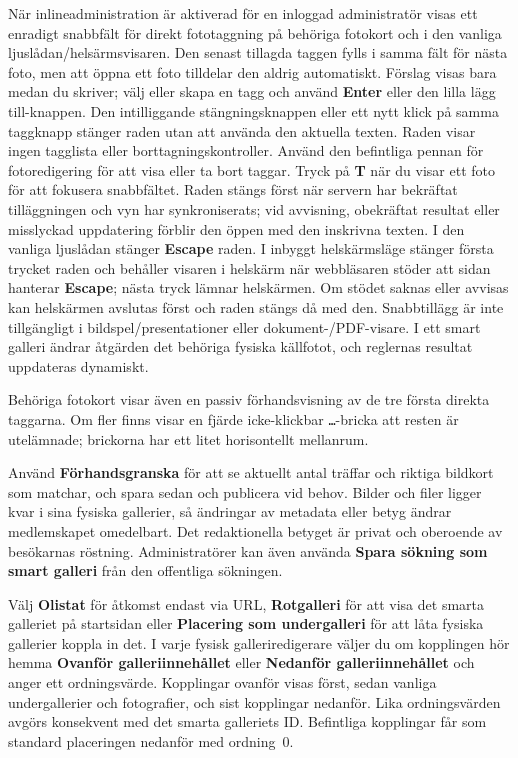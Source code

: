 \documentclass[11pt,a4paper]{article}
\newcommand{\ui}[1]{\textbf{#1}}
\begin{document}
När inlineadministration är aktiverad för en inloggad administratör visas ett
enradigt snabbfält för direkt fototaggning på behöriga fotokort och i den
vanliga
ljuslådan/helsärmsvisaren. Den senast tillagda taggen fylls i samma fält för
nästa
foto, men att öppna ett foto tilldelar den aldrig automatiskt. Förslag visas
bara
medan du skriver; välj eller skapa en tagg och använd \ui{Enter} eller den lilla
lägg till-knappen. Den intilliggande stängningsknappen eller ett nytt klick på
samma
taggknapp stänger raden utan att använda den aktuella texten. Raden visar ingen
tagglista eller borttagningskontroller. Använd
den befintliga pennan för fotoredigering för att visa eller ta bort taggar.
Tryck
på \ui{T} när du visar ett foto för att fokusera snabbfältet. Raden stängs först
när
servern har bekräftat tilläggningen och vyn har synkroniserats; vid avvisning,
obekräftat resultat eller misslyckad uppdatering förblir den öppen med den
inskrivna
texten. I den vanliga ljuslådan stänger \ui{Escape} raden.
I inbyggt helskärmsläge stänger första trycket raden och behåller visaren i
helskärm
när webbläsaren stöder att sidan hanterar \ui{Escape}; nästa tryck lämnar
helskärmen.
Om stödet saknas eller avvisas kan helskärmen avslutas först och raden stängs då
med
den. Snabbtillägg är inte
tillgängligt i bildspel/presentationer eller dokument-/PDF-visare. I ett smart
galleri ändrar åtgärden det behöriga fysiska källfotot, och reglernas resultat
uppdateras dynamiskt.

Behöriga fotokort visar även en passiv förhandsvisning av de tre första direkta
taggarna. Om fler finns visar en fjärde icke-klickbar \texttt{…}-bricka att
resten är utelämnade; brickorna har ett litet horisontellt mellanrum.

Använd \ui{Förhandsgranska} för att se aktuellt antal träffar och riktiga
bildkort som matchar, och spara sedan och publicera vid behov. Bilder och filer
ligger kvar i sina fysiska gallerier, så ändringar av metadata eller betyg
ändrar medlemskapet omedelbart. Det redaktionella betyget är privat och
oberoende av besökarnas röstning. Administratörer kan även använda \ui{Spara
sökning som smart galleri} från den offentliga sökningen.

Välj \ui{Olistat} för åtkomst endast via URL, \ui{Rotgalleri} för att visa det
smarta galleriet på startsidan eller \ui{Placering som undergalleri} för att
låta fysiska gallerier koppla in det. I varje fysisk galleriredigerare väljer du
om kopplingen hör hemma \ui{Ovanför galleriinnehållet} eller \ui{Nedanför
galleriinnehållet} och anger ett ordningsvärde. Kopplingar ovanför visas först,
sedan vanliga undergallerier och fotografier, och sist kopplingar nedanför. Lika
ordningsvärden avgörs konsekvent med det smarta galleriets ID. Befintliga
kopplingar får som standard placeringen nedanför med ordning~0.
\end{document}
